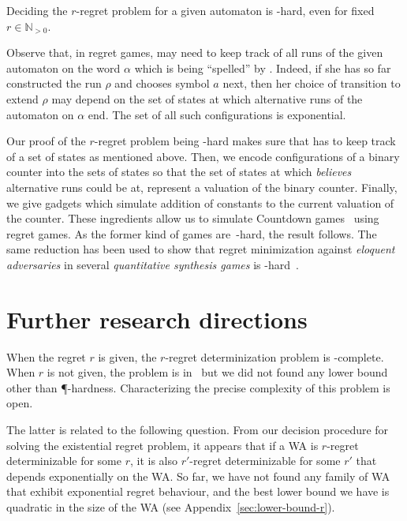 \documentclass[a4paper]{article}
\begin{document}
\begin{theorem}\label{thm:regret-lower-bound}
	Deciding the $r$-regret problem for a given automaton is
	\EXP-hard, even for fixed $r \in \mathbb{N}_{>0}$.
\end{theorem}

Observe that, in regret games, \eve may need to keep track of all runs of the
given automaton on the word $\alpha$ which is being ``spelled'' by \adam.
Indeed, if she has so far constructed the run $\rho$ and \adam chooses symbol
$a$ next, then her choice of transition to extend $\rho$ may depend on the set
of states at which alternative runs of the automaton on $\alpha$ end. The set of
all such configurations is exponential.
%

Our proof of the $r$-regret problem being \EXP-hard makes sure that \eve has to
keep track of a set of states as mentioned above. Then, we encode configurations
of a binary counter into the sets of states so that the set of states at which
\eve \emph{believes} alternative runs could be at, represent a valuation of the
binary counter. Finally, we give gadgets which simulate addition of constants to
the current valuation of the counter. These ingredients allow us to simulate
Countdown games~\cite{jsl08} using regret games. As the former kind of games
are~\EXP-hard, the result follows. The same reduction has been used to show that
regret minimization against \emph{eloquent adversaries} in several
\emph{quantitative synthesis games} is \EXP-hard~\cite{hpr15-journal}.

\section{Further research directions}
When the regret $r$ is given, the $r$-regret determinization problem
is \EXP-complete. When $r$ is not given, the problem is in
\EXP~but we did not found any lower bound other than
\P-hardness. Characterizing the precise complexity of this problem is open. 


The latter is related to the following question. From our decision procedure for
solving the existential regret problem, it appears that if a WA is $r$-regret
determinizable for some $r$, it is also $r'$-regret determinizable for some $r'$
that depends exponentially on the WA. So far, we have not found any family of WA
that exhibit exponential regret behaviour, and the best lower bound we have is
quadratic in the size of the WA (see Appendix~\ref{sec:lower-bound-r}).
\end{document}
